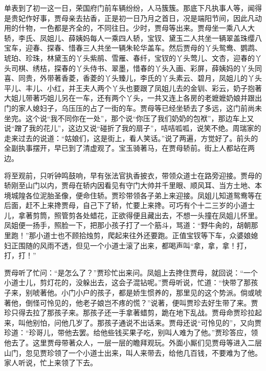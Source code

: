 \begin{parag}
    单表到了初一这一日，荣国府门前车辆纷纷，人马簇簇。那底下凡执事人等，闻得是贵妃作好事，贾母亲去拈香，正是初一日乃月之首日，况是端阳节间，因此凡动用的什物，一色都是齐全的，不同往日。少时，贾母等出来。贾母坐一乘八人大轿，李氏、凤姐儿、薛姨妈每人一乘四人轿，宝钗、黛玉二人共坐一辆翠盖珠缨八宝车，迎春、探春、惜春三人共坐一辆朱轮华盖车。然后贾母的丫头鸳鸯、鹦鹉、琥珀、珍珠，林黛玉的丫头紫鹃、雪雁、春纤，宝钗的丫头莺儿、文杏，迎春的丫头司棋、绣桔，探春的丫头侍书、翠墨，惜春的丫头入画、彩屏，薛姨妈的丫头同喜、同贵，外带著香菱，香菱的丫头臻儿，李氏的丫头素云、碧月，凤姐儿的丫头平儿、丰儿、小红，并王夫人两个丫头也要跟了凤姐儿去的金钏、彩云，奶子抱著大姐儿带著巧姐儿另在一车，还有两个丫头，一共又连上各房的老嬷嬷奶娘并跟出门的家人媳妇子，乌压压的占了一街的车。贾母等已经坐轿去了多远，这门前尚未坐完。这个说“我不同你在一处”，那个说“你压了我们奶奶的包袱”，那边车上又说“蹭了我的花儿”，这边又说“碰折了我的扇子”，咭咭呱呱，说笑不绝。周瑞家的走来过去的说道：“姑娘们，这是街上，看人笑话。”说了两遍，方觉好了。前头的全副执事摆开，早已到了清虚观了。宝玉骑著马，在贾母轿前。街上人都站在两边。
\end{parag}


\begin{parag}
    将至观前，只听钟鸣鼓响，早有张法官执香披衣，带领众道士在路旁迎接。贾母的轿刚至山门以内，贾母在轿内因看见有守门大帅并千里眼、顺风耳、当方土地、本境城隍各位泥胎圣像，便命住轿。贾珍带领各子弟上来迎接。凤姐儿知道鸳鸯等在后面，赶不上来搀贾母，自己下了轿，忙要上来搀。可巧有个十二三岁的小道士儿，拿著剪筒，照管剪各处蜡花，正欲得便且藏出去，不想一头撞在凤姐儿怀里。凤姐便一扬手，照脸一下，把那小孩子打了一个筋斗，骂道：“野牛肏的，胡朝那里跑！”那小道士也不顾拾烛剪，爬起来往外还要跑。正值宝钗等下车，众婆娘媳妇正围随的风雨不透，但见一个小道士滚了出来，都喝声叫“拿，拿，拿！打，打，打！”
\end{parag}


\begin{parag}
    贾母听了忙问：“是怎么了？”贾珍忙出来问。凤姐上去搀住贾母，就回说：“一个小道士儿，剪灯花的，没躲出去，这会子混钻呢。”贾母听说，忙道：“快带了那孩子来，别唬著他。小门小户的孩子，都是娇生惯养的，那里见的这个势派。倘或唬著他，倒怪可怜见的，他老子娘岂不疼的慌？”说著，便叫贾珍去好生带了来。贾珍只得去拉了那孩子来。那孩子还一手拿著蜡剪，跪在地下乱战。贾母命贾珍拉起来，叫他别怕，问他几岁了。那孩子通说不出话来。贾母还说“可怜见的”，又向贾珍道：“珍哥儿，带他去罢。给他些钱买果子吃，别叫人难为了他。”贾珍答应，领他去了。这里贾母带著众人，一层一层的瞻拜观玩。外面小厮们见贾母等进入二层山门，忽见贾珍领了一个小道士出来，叫人来带去，给他几百钱，不要难为了他。家人听说，忙上来领了下去。
\end{parag}


